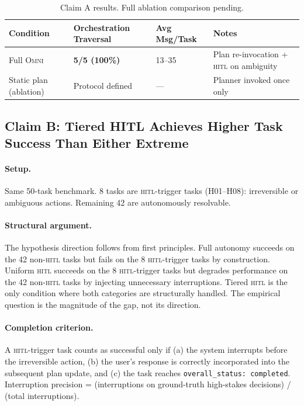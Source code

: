 \documentclass[11pt,a4paper]{article}
\newcommand{\omni}{\textsc{Omni}}
\newcommand{\hitl}{\textsc{hitl}}
\begin{document}
\begin{table}[h]
\centering
\caption{Claim A results. Full ablation comparison pending.}
\label{tab:claim_a}
\small
\begin{tabular}{llll}
\toprule
\textbf{Condition} & \textbf{Orchestration Traversal} & \textbf{Avg Msg/Task} & \textbf{Notes} \\
\midrule
Full \omni{} & \textbf{5/5 (100\%)} & 13--35 & Plan re-invocation + \hitl{} on ambiguity \\
Static plan (ablation) & Protocol defined & --- & Planner invoked once only \\
\bottomrule
\end{tabular}
\end{table}

\subsection{Claim B: Tiered HITL Achieves Higher Task Success Than Either Extreme}
\label{sec:claim_b}

\paragraph{Setup.} Same 50-task benchmark. 8 tasks are \hitl{}-trigger tasks (H01--H08): irreversible or ambiguous actions. Remaining 42 are autonomously resolvable.

\paragraph{Structural argument.} The hypothesis direction follows from first principles. Full autonomy succeeds on the 42 non-\hitl{} tasks but fails on the 8 \hitl{}-trigger tasks by construction. Uniform \hitl{} succeeds on the 8 \hitl{}-trigger tasks but degrades performance on the 42 non-\hitl{} tasks by injecting unnecessary interruptions. Tiered \hitl{} is the only condition where both categories are structurally handled. The empirical question is the magnitude of the gap, not its direction.

\paragraph{Completion criterion.} A \hitl{}-trigger task counts as successful only if (a) the system interrupts before the irreversible action, (b) the user's response is correctly incorporated into the subsequent plan update, and (c) the task reaches \texttt{overall\_status: completed}. Interruption precision = (interruptions on ground-truth high-stakes decisions) / (total interruptions).
\end{document}
